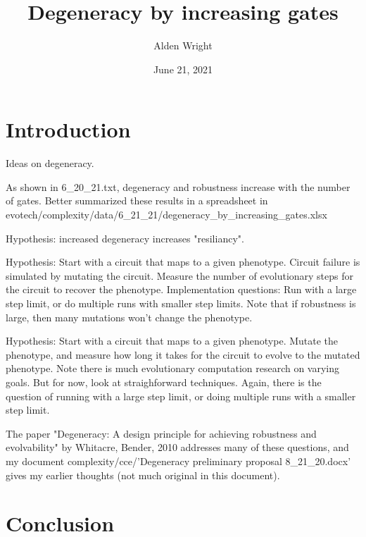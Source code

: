 \documentclass{article}
\title{Degeneracy by increasing gates}
\author{Alden Wright }
\date{June 21, 2021}
\begin{document}
\maketitle

\section{Introduction}
Ideas on degeneracy.

As shown in 6\_20\_21.txt, degeneracy and robustness increase with the number of gates.
Better summarized these results in a spreadsheet in
evotech/complexity/data/6\_21\_21/degeneracy\_by\_increasing\_gates.xlsx

Hypothesis:  increased degeneracy increases "resiliancy".

Hypothesis:  Start with a circuit that maps to a given phenotype.  Circuit failure
is simulated by mutating the circuit.  Measure the number of evolutionary steps
for the circuit to recover the phenotype.  Implementation questions:
Run with a large step limit, or do multiple runs with smaller step limits.
Note that if robustness is large, then many mutations won't change the phenotype.

Hypothesis:  Start with a circuit that maps to a given phenotype.  Mutate the phenotype,
and measure how long it takes for the circuit to evolve to the mutated phenotype.
Note there is much evolutionary computation research on varying goals.  But for now,
look at straighforward techniques.  Again, there is the question of running with a
large step limit, or doing multiple runs with a smaller step limit.

The paper "Degeneracy: A design principle for achieving robustness and evolvability"
by Whitacre, Bender, 2010 
\cite{RefWorks:doc:5e800362e4b03e5926388ac6} 
addresses many of these questions, and my document
complexity/cce/'Degeneracy preliminary proposal 8\_21\_20.docx' gives my earlier thoughts
(not much original in this document).                         

\section{Conclusion}




\end{document}
